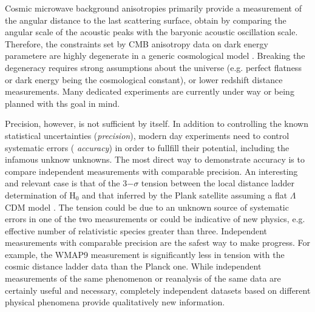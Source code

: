 Cosmic microwave background anisotropies primarily provide a
measurement of the angular distance to the last scattering surface,
obtain by comparing the angular scale of the acoustic peaks with the
baryonic acoustic oscillation scale. Therefore, the constraints set by
CMB anisotropy data on dark energy parametere are highly degenerate in
a generic cosmological model
\cite[e.g.,][]{Pla15}. Breaking the degeneracy requires strong
assumptions about the universe (e.g. perfect flatness or dark energy
being the cosmological constant), or lower redshift distance
measurements. Many dedicated experiments are currently under way or
being planned with ths goal in mind. 



Precision, however, is not sufficient by itself. In addition to
controlling the known statistical uncertainties ({\it precision}),
modern day experiments need to control systematic errors ({\it
accuracy}) in order to fullfill their potential, including the
infamous unknow unknowns. The most direct way to demonstrate accuracy
is to compare independent measurements with comparable precision. An
interesting and relevant case is that of the 3$-\sigma$ tension
between the local distance ladder determination of H$_0$
\cite{Rie++16} and that inferred by the Plank satellite assuming a
flat $\Lambda$CDM model \cite{Pla+15}. The tension could be due to an
unknown source of systematic errors in one of the two measurements or
could be indicative of new physics, e.g. effective number of
relativistic species greater than three. Independent measurements with
comparable precision are the safest way to make progress. For example,
the WMAP9 measurement \cite{Cal++13} is significantly less in tension
with the cosmic distance ladder data than the Planck one. While
independent measurements of the same phenomenon or reanalysis of the
same data \cite{Efs14,SFH15} are certainly useful and necessary,
completely independent datasets based on different physical phenomena
provide qualitatively new information.

